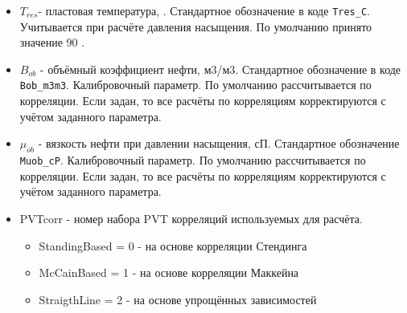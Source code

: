 \begin{itemize}
\item $T_{res}$- пластовая температура, \textcelsius. Стандартное обозначение в коде \texttt{Tres_C}. Учитывается при расчёте давления насыщения. По умолчанию принято значение 90 \textcelsius.

\item $B_{ob}$ - объёмный коэффициент нефти, м3/м3. Стандартное обозначение в коде \texttt{Bob_m3m3}. Калибровочный параметр. По умолчанию рассчитывается по корреляции. Если задан, то все расчёты по корреляциям корректируются с учётом заданного параметра.

\item $\mu_{ob}$ - вязкость нефти при давлении насыщения, сП. Стандартное обозначение \texttt{Muob_cP}. Калибровочный параметр. По умолчанию рассчитывается по корреляции. Если задан, то все расчёты по корреляциям корректируются с учётом заданного параметра.

\item PVTcorr - номер набора PVT корреляций используемых для расчёта. 
\begin{itemize}	
	\item 	StandingBased = 0 - на основе корреляции Стендинга
	\item 	McCainBased = 1 - на основе корреляции Маккейна
	\item 	StraigthLine = 2 - на основе упрощённых зависимостей
\end{itemize}






\end{itemize}

